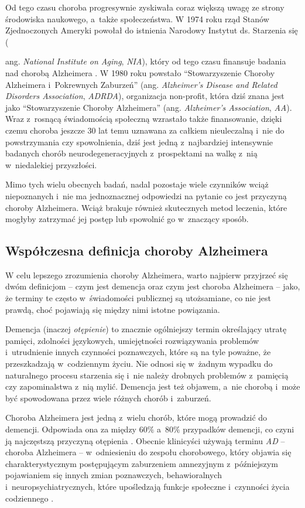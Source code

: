 Od tego czasu choroba progresywnie zyskiwała coraz większą uwagę ze strony środowiska naukowego, a~także społeczeństwa.
W 1974 roku rząd Stanów Zjednoczonych Ameryki powołał do istnienia Narodowy Instytut ds. Starzenia się ({ang. \emph{National Institute on Aging}, \emph{NIA}), który od tego czasu finansuje badania nad chorobą Alzheimera \cite{marx1974aging}.
W 1980 roku powstało ``Stowarzyszenie Choroby Alzheimera i~Pokrewnych Zaburzeń'' (ang. \emph{Alzheimer's Disease and Related Disorders Association}, \emph{ADRDA}), organizacja non-profit, która dziś znana jest jako ``Stowarzyszenie Choroby Alzheimera'' (ang. \emph{Alzheimer's Association}, \emph{AA}).
Wraz z~rosnącą świadomością społeczną wzrastało także finansowanie, dzięki czemu choroba jeszcze 30 lat temu uznawana za całkiem nieuleczalną i~nie do powstrzymania czy spowolnienia, dziś jest jedną z~najbardziej intensywnie badanych chorób neurodegeneracyjnych z~prospektami na walkę z~nią w~niedalekiej przyszłości.

Mimo tych wielu obecnych badań, nadal pozostaje wiele czynników wciąż niepoznanych i~nie ma jednoznacznej odpowiedzi na pytanie co jest przyczyną choroby Alzheimera.
Wciąż brakuje również skutecznych metod leczenia, które mogłyby zatrzymać jej postęp lub spowolnić go w~znaczący sposób.

\subsection{Współczesna definicja choroby Alzheimera}

W celu lepszego zrozumienia choroby Alzheimera, warto najpierw przyjrzeć się dwóm definicjom -- czym jest demencja oraz czym jest choroba Alzheimera -- jako, że terminy te często w~świadomości publicznej są utożsamiane, co nie jest prawdą, choć pojawiają się między nimi istotne powiązania.

Demencja (inaczej \emph{otępienie}) to znacznie ogólniejszy termin określający utratę pamięci, zdolności językowych, umiejętności rozwiązywania problemów i~utrudnienie innych czynności poznawczych, które są na tyle poważne, że przeszkadzają w~codziennym życiu.
Nie odnosi się w~żadnym wypadku do naturalnego procesu starzenia się i~nie należy drobnych problemów z~pamięcią czy zapominalstwa z~nią mylić.
Demencja jest też objawem, a~nie chorobą i~może być spowodowana przez wiele różnych chorób i~zaburzeń.

Choroba Alzheimera jest jedną z~wielu chorób, które mogą prowadzić do demencji.
Odpowiada ona za między $60\%$ a~$80\%$ przypadków demencji, co czyni ją najczęstszą przyczyną otępienia \cite{what-is-alzheimers:2023}.
Obecnie klinicyści używają terminu \emph{AD} -- choroba Alzheimera -- w~odniesieniu do zespołu chorobowego, który objawia się charakterystycznym postępującym zaburzeniem amnezyjnym z~późniejszym pojawianiem się innych zmian poznawczych, behawioralnych i~neuropsychiatrycznych, które upośledzają funkcje społeczne i~czynności życia codziennego \cite{cummings2004alzheimer}.

}

